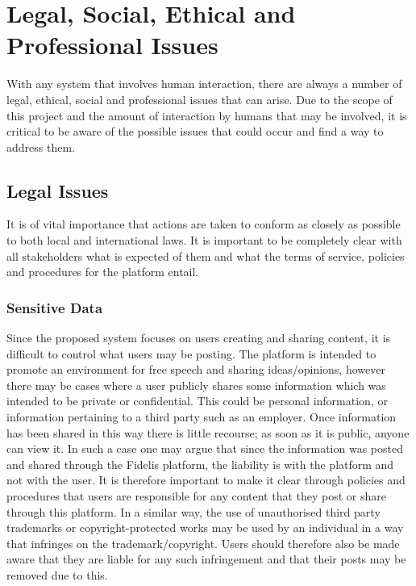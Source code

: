 \chapter{Legal, Social, Ethical and Professional Issues}
\label{Chapter:Issues}
With any system that involves human interaction, there are always a number of legal, ethical, social and professional issues that can arise. Due to the scope of this project and the amount of interaction by humans that may be involved, it is critical to be aware of the possible issues that could occur and find a way to address them.

\section{Legal Issues}
It is of vital importance that actions are taken to conform as closely as possible to both local and international laws. It is important to be completely clear with all stakeholders what is expected of them and what the terms of service, policies and procedures for the platform entail.

\subsection{Sensitive Data}
Since the proposed system focuses on users creating and sharing content, it is difficult to control what users may be posting. The platform is intended to promote an environment for free speech and sharing ideas/opinions, however there may be cases where a user publicly shares some information which was intended to be private or confidential. This could be personal information, or information pertaining to a third party such as an employer. Once information has been shared in this way there is little recourse; as soon as it is public, anyone can view it. In such a case one may argue that since the information was posted and shared through the Fidelis platform, the liability is with the platform and not with the user. It is therefore important to make it clear through policies and procedures that users are responsible for any content that they post or share through this platform. In a similar way, the use of unauthorised third party trademarks or copyright-protected works may be used by an individual in a way that infringes on the trademark/copyright. Users should therefore also be made aware that they are liable for any such infringement and that their posts may be removed due to this.


